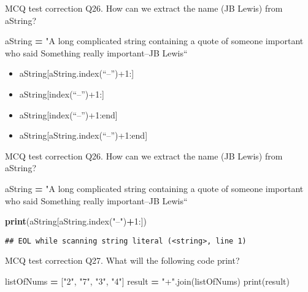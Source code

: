 \documentclass[
  8pt,
  ignorenonframetext,
]{beamer}
\newenvironment{Shaded}{\begin{snugshade}}{\end{snugshade}}
\newcommand{\BuiltInTok}[1]{#1}
\newcommand{\DecValTok}[1]{\textcolor[rgb]{0.00,0.00,0.81}{#1}}
\newcommand{\ErrorTok}[1]{\textcolor[rgb]{0.64,0.00,0.00}{\textbf{#1}}}
\newcommand{\NormalTok}[1]{#1}
\newcommand{\OperatorTok}[1]{\textcolor[rgb]{0.81,0.36,0.00}{\textbf{#1}}}
\newcommand{\StringTok}[1]{\textcolor[rgb]{0.31,0.60,0.02}{#1}}
\providecommand{\tightlist}{%
  \setlength{\itemsep}{0pt}\setlength{\parskip}{0pt}}
\begin{document}
\begin{frame}[fragile]{MCQ test correction}
\protect\hypertarget{mcq-test-correction-50}{}
Q26. How can we extract the name (JB Lewis) from aString?

\begin{Shaded}
\begin{Highlighting}[]
\NormalTok{aString }\OperatorTok{=} \StringTok{"A long complicated string containing a quote of someone important who said \textquotesingle{}Something really important\textquotesingle{}–JB Lewis“}
\end{Highlighting}
\end{Shaded}

\begin{itemize}
\tightlist
\item
  aString{[}aString.index(``--'')+1:{]}
\item
  aString{[}index(``--'')+1:{]}
\item
  aString{[}index(``--'')+1:end{]}
\item
  aString{[}aString.index(``--'')+1:end{]}
\end{itemize}
\end{frame}

\begin{frame}[fragile]{MCQ test correction}
\protect\hypertarget{mcq-test-correction-51}{}
Q26. How can we extract the name (JB Lewis) from aString?

\begin{Shaded}
\begin{Highlighting}[]
\NormalTok{aString }\OperatorTok{=} \StringTok{"A long complicated string containing a quote of someone important who said \textquotesingle{}Something really important\textquotesingle{}–JB Lewis“}

\ErrorTok{print}\NormalTok{(aString[aString.index(}\StringTok{"–"}\NormalTok{)}\OperatorTok{+}\DecValTok{1}\NormalTok{:])}
\end{Highlighting}
\end{Shaded}

\begin{verbatim}
## EOL while scanning string literal (<string>, line 1)
\end{verbatim}
\end{frame}

\begin{frame}[fragile]{MCQ test correction}
\protect\hypertarget{mcq-test-correction-52}{}
Q27. What will the following code print?

\begin{Shaded}
\begin{Highlighting}[]
\NormalTok{listOfNums }\OperatorTok{=}\NormalTok{ [}\StringTok{"2"}\NormalTok{, }\StringTok{"7"}\NormalTok{, }\StringTok{"3"}\NormalTok{, }\StringTok{"4"}\NormalTok{]}
\NormalTok{result }\OperatorTok{=} \StringTok{"+"}\NormalTok{.join(listOfNums)}
\BuiltInTok{print}\NormalTok{(result)}
\end{Highlighting}
\end{Shaded}
\end{frame}
\end{document}
